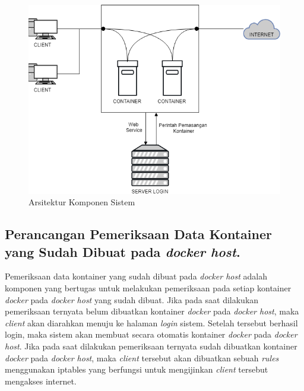       \begin{figure}[H]
        \centering
        \includegraphics[width=\linewidth]{images/bab3/arsitekttur_komponen}
        \caption{Arsitektur Komponen Sistem}
        \label{Arsitektur Komponen Sistem}
      \end{figure} 
    \subsection{Perancangan Pemeriksaan Data Kontainer yang Sudah Dibuat pada \textit{docker host}.}
    Pemeriksaan data kontainer yang sudah dibuat pada \textit{docker host} adalah komponen yang bertugas untuk melakukan pemeriksaan pada setiap kontainer \textit{docker} pada \textit{docker host} yang sudah dibuat. Jika pada saat dilakukan pemeriksaan ternyata belum dibuatkan kontainer \textit{docker} pada \textit{docker host}, maka \textit{client} akan diarahkan menuju ke halaman \textit{login} sistem. Setelah \textit{} tersebut berhasil login, maka sistem akan membuat secara otomatis kontainer \textit{docker} pada \textit{docker host}. Jika pada saat dilakukan pemeriksaan ternyata sudah dibuatkan kontainer \textit{docker} pada \textit{docker host}, maka \textit{client} tersebut akan dibuatkan sebuah \textit{rules} menggunakan iptables yang berfungsi untuk mengijinkan \textit{client} tersebut mengakses internet.
    
